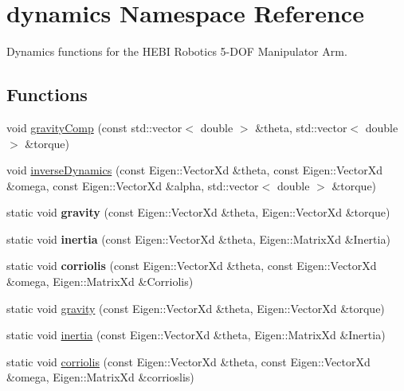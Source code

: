 \hypertarget{namespacedynamics}{}\section{dynamics Namespace Reference}
\label{namespacedynamics}


Dynamics functions for the H\+E\+BI Robotics 5-\/\+D\+OF Manipulator Arm.  


\subsection*{Functions}
\begin{DoxyCompactItemize}
\item 
void \hyperlink{namespacedynamics_a00e914433e77671dac03be0ca7d34e1f}{gravity\+Comp} (const std\+::vector$<$ double $>$ \&theta, std\+::vector$<$ double $>$ \&torque)
\item 
void \hyperlink{namespacedynamics_a6f9761c4fbb20c590cfb1ae345e2ff61}{inverse\+Dynamics} (const Eigen\+::\+Vector\+Xd \&theta, const Eigen\+::\+Vector\+Xd \&omega, const Eigen\+::\+Vector\+Xd \&alpha, std\+::vector$<$ double $>$ \&torque)
\item 
static void {\bfseries gravity} (const Eigen\+::\+Vector\+Xd \&theta, Eigen\+::\+Vector\+Xd \&torque)\hypertarget{namespacedynamics_a826b52a5f1fc2dd61ea69a771c8eec94}{}\label{namespacedynamics_a826b52a5f1fc2dd61ea69a771c8eec94}

\item 
static void {\bfseries inertia} (const Eigen\+::\+Vector\+Xd \&theta, Eigen\+::\+Matrix\+Xd \&Inertia)\hypertarget{namespacedynamics_a9fc7ae178c0d08f46bd2b18dd86d36ae}{}\label{namespacedynamics_a9fc7ae178c0d08f46bd2b18dd86d36ae}

\item 
static void {\bfseries corriolis} (const Eigen\+::\+Vector\+Xd \&theta, const Eigen\+::\+Vector\+Xd \&omega, Eigen\+::\+Matrix\+Xd \&Corriolis)\hypertarget{namespacedynamics_a64347919700ac9a683912de6f2b141fb}{}\label{namespacedynamics_a64347919700ac9a683912de6f2b141fb}

\item 
static void \hyperlink{namespacedynamics_a826b52a5f1fc2dd61ea69a771c8eec94}{gravity} (const Eigen\+::\+Vector\+Xd \&theta, Eigen\+::\+Vector\+Xd \&torque)
\item 
static void \hyperlink{namespacedynamics_a9fc7ae178c0d08f46bd2b18dd86d36ae}{inertia} (const Eigen\+::\+Vector\+Xd \&theta, Eigen\+::\+Matrix\+Xd \&Inertia)
\item 
static void \hyperlink{namespacedynamics_a09facde2bbc78b9a537aa3b03fffec5f}{corriolis} (const Eigen\+::\+Vector\+Xd \&theta, const Eigen\+::\+Vector\+Xd \&omega, Eigen\+::\+Matrix\+Xd \&corrioslis)
\end{DoxyCompactItemize}


